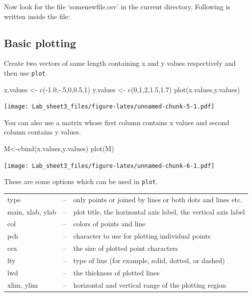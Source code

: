 \documentclass[
]{article}
\newenvironment{Shaded}{\begin{snugshade}}{\end{snugshade}}
\newcommand{\DecValTok}[1]{\textcolor[rgb]{0.00,0.00,0.81}{#1}}
\newcommand{\FloatTok}[1]{\textcolor[rgb]{0.00,0.00,0.81}{#1}}
\newcommand{\FunctionTok}[1]{\textcolor[rgb]{0.00,0.00,0.00}{#1}}
\newcommand{\NormalTok}[1]{#1}
\newcommand{\OtherTok}[1]{\textcolor[rgb]{0.56,0.35,0.01}{#1}}
\newcommand{\SpecialCharTok}[1]{\textcolor[rgb]{0.00,0.00,0.00}{#1}}
\theoremstyle{remark}
\begin{document}
Now look for the file `somenewfile.csv' in the current directory.
Following is written inside the file:



\hypertarget{basic-plotting}{%
\subsection{Basic plotting}\label{basic-plotting}}

Create two vectors of same length containing x and y values respectively
and then use \texttt{plot}.

\begin{Shaded}
\begin{Highlighting}[]
\NormalTok{x.values }\OtherTok{\textless{}{-}} \FunctionTok{c}\NormalTok{(}\SpecialCharTok{{-}}\FloatTok{1.0}\NormalTok{,}\SpecialCharTok{{-}}\NormalTok{.}\DecValTok{5}\NormalTok{,}\DecValTok{0}\NormalTok{,}\FloatTok{0.5}\NormalTok{,}\DecValTok{1}\NormalTok{)}
\NormalTok{y.values }\OtherTok{\textless{}{-}} \FunctionTok{c}\NormalTok{(}\DecValTok{0}\NormalTok{,}\DecValTok{1}\NormalTok{,}\DecValTok{2}\NormalTok{,}\FloatTok{1.5}\NormalTok{,}\FloatTok{1.7}\NormalTok{)}
\FunctionTok{plot}\NormalTok{(x.values,y.values)}
\end{Highlighting}
\end{Shaded}

\texttt{[image: Lab\_sheet3\_files/figure-latex/unnamed-chunk-5-1.pdf]}

You can also use a matrix whose first column contains x values and
second column contains y values.

\begin{Shaded}
\begin{Highlighting}[]
\NormalTok{M}\OtherTok{\textless{}{-}}\FunctionTok{cbind}\NormalTok{(x.values,y.values)}
\FunctionTok{plot}\NormalTok{(M)}
\end{Highlighting}
\end{Shaded}

\texttt{[image: Lab\_sheet3\_files/figure-latex/unnamed-chunk-6-1.pdf]}

These are some options which can be used in \texttt{plot}.

\begin{center}
    \begin{tabular}{lll}
type&-- & only points or joined by lines or both dots and lines etc.\\
main, xlab, ylab&--& plot title, the horizontal axis label,
the vertical axis label\\
col&--&colors of points and line\\
pch&--&character to use for plotting individual points\\
cex&--&the size of plotted point characters\\
lty&--&type of line (for example, solid, dotted, or dashed)\\
lwd&--&the thickness of plotted lines\\
xlim, ylim&--& horizontal and vertical range of the plotting region
\end{tabular}
\end{center}
\end{document}
